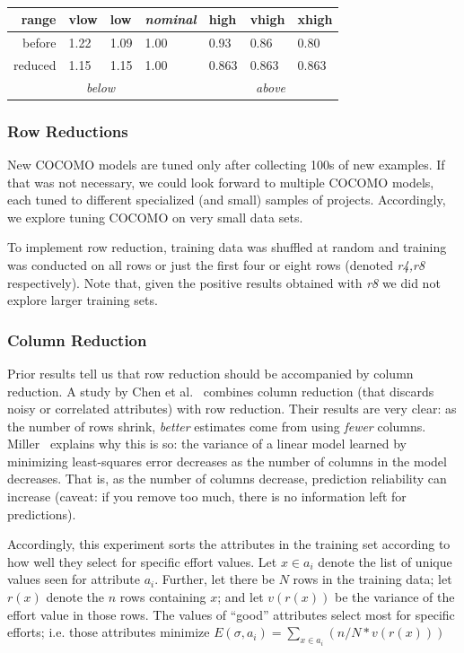 \documentclass[smallcondesed]{svjour3}
\begin{document}
{\small   
~~~~~~\begin{tabular}{r|ll|l|lll|}
      range      & vlow&  low&{\em nominal}&high&vhigh&xhigh\\\hline
     before & 1.22& 1.09& 1.00& 0.93& 0.86& 0.80\\
     reduced&1.15& 1.15& 1.00&  0.863& 0.863&0.863\\\cline{2-3}\cline{5-7}
                 & \multicolumn{2}{c|}{{\em below}} &&\multicolumn{3}{c|}{{\em above}}
\end{tabular}
 }
\subsubsection{Row Reductions}\label{sect:row}
New COCOMO models are tuned only after collecting
100s of new examples. If that was not necessary, we could look forward to multiple
COCOMO models, each tuned to different specialized (and small) samples of projects.
Accordingly, we explore tuning COCOMO
on very small data sets.

To implement  row reduction, training data was
shuffled at random and training was conducted on
all rows or  just the first four or eight  rows
(denoted {\em r4,r8} respectively). Note that, given  the positive
results obtained with {\em r8} we did not explore larger training sets.



\subsubsection{Column Reduction}\label{sect:pruner}

Prior results tell us that row reduction should be
accompanied by column reduction.  A study by Chen et
al.~\cite{chen05a} combines column reduction (that
discards noisy or correlated attributes) with row
reduction. Their results are very clear: as the
number of rows shrink, {\em better} estimates come
from using {\em fewer}
columns. Miller~\cite{miller02} explains  why this is so:  the variance of a
linear model learned by minimizing least-squares error decreases as the number of columns in the model
decreases. That is, as the number of columns decrease,
prediction reliability can increase (caveat: 
if you remove too much,
there is no information left for predictions).

Accordingly, this experiment sorts the attributes in the training set according
to how well they select for specific effort values. 
Let $x\in a_i$ denote the list of unique values seen for attribute $a_i$. Further,
let there be $N$ rows in the training data; 
let  $r(x)$ denote the $n$ rows containing $x$; and let $v(r(x))$ be the variance
of the effort value in those rows. The values of ``good'' attributes
select most for specific efforts; i.e. those attributes minimize
$E(\sigma,a_i) =\sum_{x\in a_i} \left(n/N * v(r(x))\right)$
\end{document}

